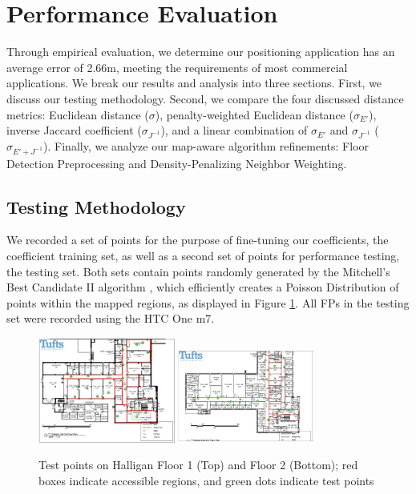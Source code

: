 \documentclass[conference]{IEEEtran}
\begin{document}
\section{Performance Evaluation}

Through empirical evaluation, we determine our positioning application has an average error of 2.66m, meeting the requirements of most commercial applications. We break our results and analysis into three sections. First, we discuss our testing methodology. Second, we compare the four discussed distance metrics: Euclidean distance ($\sigma$), penalty-weighted Euclidean distance ($\sigma_{E'}$), inverse Jaccard coefficient ($\sigma_{J^{-1}}$), and a linear combination of $\sigma_{E'}$ and $\sigma_{J^{-1}}$ ($\sigma_{E' + J^{-1}}$). Finally, we analyze our map-aware algorithm refinements: Floor Detection Preprocessing and Density-Penalizing Neighbor Weighting.

\subsection{Testing Methodology}
We recorded a set of points for the purpose of fine-tuning our coefficients, the coefficient training set, as well as a second set of points for performance testing, the testing set. Both sets contain points randomly generated by the Mitchell's Best Candidate II algorithm \cite{Machaj}, which efficiently creates a Poisson Distribution of points within the mapped regions, as displayed in Figure \ref{fig:test_points}. All FPs in the testing set were recorded using the HTC One m7. 

\begin{figure}[t!]
  \centering
    \includegraphics[width=0.4\textwidth]{TestFloor1.png}
    \includegraphics[width=0.4\textwidth]{TestFloor2.png}
   \caption{Test points on Halligan Floor 1 (Top) and Floor 2 (Bottom); red boxes indicate accessible regions, and green dots indicate test points}
   \label{fig:test_points}
\end{figure}
\end{document}
